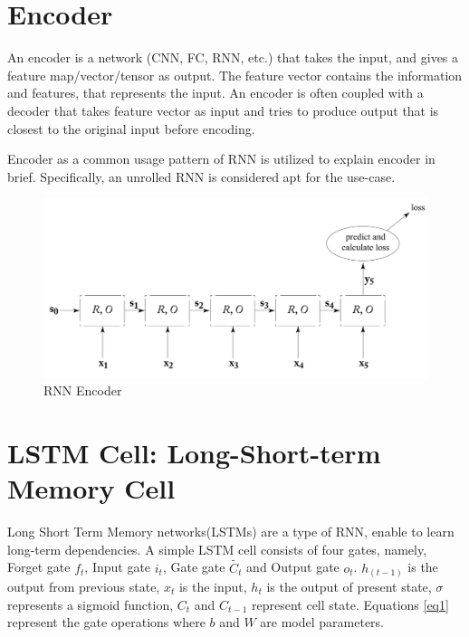 \newpage
\section{Encoder}
An encoder is a network (CNN, FC, RNN, etc.) that takes the input, and gives a feature map/vector/tensor as output. The feature vector contains the information and features, that represents the input. An encoder is often coupled with a decoder that takes feature vector as input and tries to produce output that is closest to the original input before encoding.

\newpar
Encoder as a common usage pattern of RNN is utilized to explain encoder in brief. Specifically, an unrolled RNN is considered apt for the use-case.



\begin{figure}[h!]
	\centering
	\includegraphics[scale=0.15]{figures/RNNencoder.PNG}
	\caption{RNN Encoder}
	\label{fig:rnn2}
\end{figure}



\section{LSTM Cell: Long-Short-term Memory Cell}

Long Short Term Memory networks(LSTMs)\cite{hochreiter1997long} are a type of RNN, enable to learn long-term dependencies. A simple LSTM cell consists of four gates, namely, Forget gate $f_t$, Input gate $i_t$, Gate gate $\widetilde{C_t}$ and Output gate $o_t$. $h_{(t-1)}$ is the output from previous state, $x_t$ is the input, $h_t$ is the output of present state, $\sigma$ represents a sigmoid function, $C_t$ and $C_{t-1}$ represent cell state. Equations \cref{eq1} represent the gate operations where $b$ and $W$ are model parameters.


